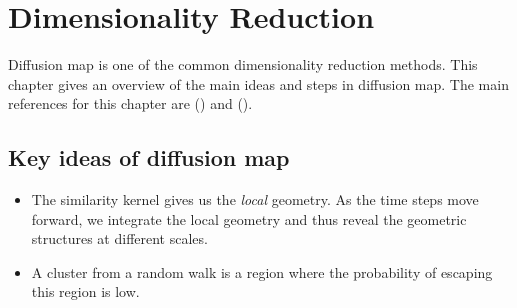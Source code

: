 \chapter{Dimensionality Reduction} 
\label{chapter2-diffmap}

Diffusion map is one of the common dimensionality reduction methods. This chapter gives an overview of the main ideas and steps in diffusion map. The main references for this chapter are (\cite{coifman_geometric_2005}) and (\cite{coifman_diffusion_2006}).

\section{Key ideas of diffusion map}

\begin{itemize}
    \item The similarity kernel gives us the \textit{local} geometry. As the time steps move forward, we integrate the local geometry and thus reveal the geometric structures at different scales. 
    \item A cluster from a random walk is a region where the probability of escaping this region is low.
\end{itemize}


